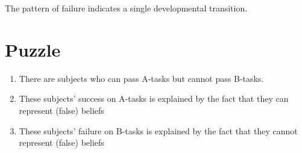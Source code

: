 \documentclass[11pt]{extarticle}
\begin{document}
\begin{multicols}{3}
The pattern of failure indicates a single developmental transition.\citep{Wellman:2001lz}

\section{Puzzle}
\begin{enumerate}
\item There are subjects who can pass A-tasks but cannot pass B-tasks.

\item These subjects’ success on A-tasks is explained by the fact that they can represent (false) beliefs

\item These subjects’  failure on B-tasks is explained by the fact that they cannot represent (false) beliefs
\end{enumerate}



\footnotesize 


\end{multicols}
\end{document}
